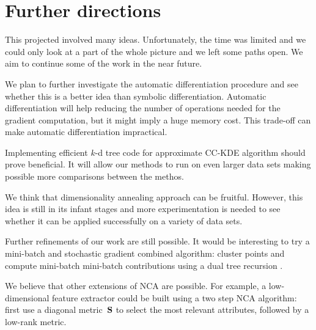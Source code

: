 \section{Further directions}
\label{sec:further-directions}

This projected involved many ideas. Unfortunately, the time was limited and we could only look at a part of the whole picture and we left some paths open. We aim to continue some of the work in the near future. 

We plan to further investigate the automatic differentiation procedure and see whether this is a better idea than symbolic differentiation. Automatic differentiation will help reducing the number of operations needed for the gradient computation, but it might imply a huge memory cost. This trade-off can make automatic differentiation impractical.

Implementing efficient $k$-d tree code for approximate CC-KDE algorithm should prove beneficial. It will allow our methods to run on even larger data sets making possible more comparisons between the methos.

We think that dimensionality annealing approach can be fruitful. However, this idea is still in its infant stages and more experimentation is needed to see whether it can be applied successfully on a variety of data sets. 

Further refinements of our work are still possible. It would be interesting to try a mini-batch and stochastic gradient combined algorithm: cluster points and compute mini-batch mini-batch contributions using a dual tree recursion \citep{gray2003}. 


We believe that other extensions of NCA are possible. For example, a low-dimensional feature extractor could be built using a two step NCA algorithm: first use a diagonal metric~$\mathbf{S}$ to select the most relevant attributes, followed by a low-rank metric. 

